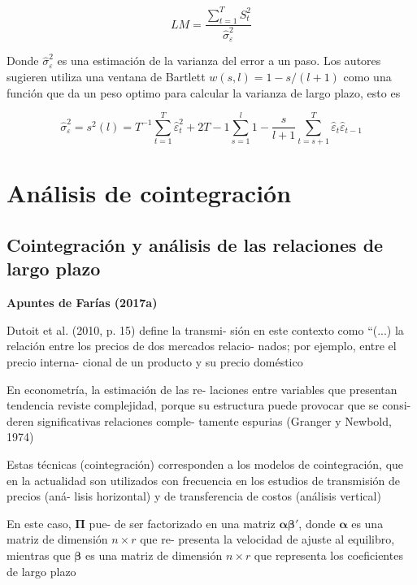 \documentclass[12pt, twoside]{book}\usepackage[]{graphicx}\usepackage[]{color}
\numberwithin{equation}{section}
\numberwithin{theorem}{section}
\numberwithin{teorema}{section}
\numberwithin{defi}{section}
\numberwithin{prop}{section}
\numberwithin{defi}{section}
\theoremstyle{plain}
\begin{document}
\begin{equation}
LM  = \frac{\sum_{t=1}^{T}S_{t}^{2}}{\hat{\sigma}^{2}_{\varepsilon}}
\end{equation}

Donde $\hat{\sigma}^{2}_{\varepsilon}$ es una estimación de la varianza del error a un paso. Los autores sugieren utiliza una ventana de Bartlett $w(s,l)=1-s/(l+1)$ como una función que da un peso optimo para calcular la varianza de largo plazo, esto es

\begin{equation}
\hat{\sigma}^{2}_{\varepsilon} = s^{2}(l)=T^{-1}\sum_{t=1}^{T}\hat{\varepsilon}^{2}_{t}+2T-1\sum_{s=1}^{l}1-\frac{s}{l+1}\sum_{t=s+1}^{T}\hat{\varepsilon}_{t}\hat{\varepsilon}_{t-1}
\end{equation}



\section{Análisis de cointegración}
\subsection{Cointegración y análisis de las relaciones de largo plazo}
 \textbf{Apuntes de Farías (2017a)}

Dutoit et al. (2010, p. 15) define la transmi-
sión en este contexto como “(...) la relación
entre los precios de dos mercados relacio-
nados; por ejemplo, entre el precio interna-
cional de un producto y su precio doméstico

En econometría, la estimación de las re-
laciones entre variables que presentan
tendencia reviste complejidad, porque su
estructura puede provocar que se consi-
deren significativas relaciones comple-
tamente espurias (Granger y Newbold,
1974)

Estas técnicas (cointegración) corresponden
a los modelos de cointegración, que en la
actualidad son utilizados con frecuencia en
los estudios de transmisión de precios (aná-
lisis horizontal) y de transferencia de costos
(análisis vertical)


En este caso, $\boldsymbol{\Pi}$ pue-
de ser factorizado en una matriz $\boldsymbol{\alpha\beta'}$, donde
$\boldsymbol{\alpha}$ es una matriz de dimensión $n \times r$ que re-
presenta la velocidad de ajuste al equilibro,
mientras que $\boldsymbol{\beta}$ es una matriz de dimensión
$n \times r$ que representa los coeficientes de largo
plazo
\end{document}
